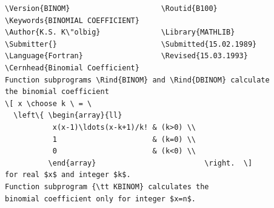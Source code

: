\documentclass[a4paper,11pt]{cernman}
\begin{document}
{\newpage
\clearpage
\samepage {}
}

{\newpage
\clearpage
\samepage \begin{sideways}\begin{minipage}[b]{\textheight}
    \begin{minipage}[b]{.49\textwidth}
    \scriptsize%
    \begin{verbatim}\Version{BINOM}                     \Routid{B100}
\Keywords{BINOMIAL COEFFICIENT}
\Author{K.S. K\"olbig}              \Library{MATHLIB}
\Submitter{}                        \Submitted{15.02.1989}
\Language{Fortran}                  \Revised{15.03.1993}
\Cernhead{Binomial Coefficient}
Function subprograms \Rind{BINOM} and \Rind{DBINOM} calculate
the binomial coefficient
\[ x \choose k \ = \ 
  \left\{ \begin{array}{ll}
           x(x-1)\ldots(x-k+1)/k! & (k>0) \\ 
           1                      & (k=0) \\ 
           0                      & (k<0) \\ 
          \end{array}                         \right.  \]
for real $x$ and integer $k$.
Function subprogram {\tt KBINOM} calculates the
binomial coefficient only for integer $x=n$.


\end{verbatim}
\end{minipage}
\end{minipage}
\end{sideways}}
\end{document}
